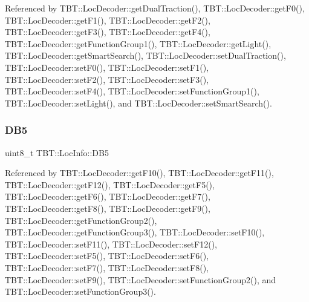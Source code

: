 Referenced by T\+B\+T\+::\+Loc\+Decoder\+::get\+Dual\+Traction(), T\+B\+T\+::\+Loc\+Decoder\+::get\+F0(), T\+B\+T\+::\+Loc\+Decoder\+::get\+F1(), T\+B\+T\+::\+Loc\+Decoder\+::get\+F2(), T\+B\+T\+::\+Loc\+Decoder\+::get\+F3(), T\+B\+T\+::\+Loc\+Decoder\+::get\+F4(), T\+B\+T\+::\+Loc\+Decoder\+::get\+Function\+Group1(), T\+B\+T\+::\+Loc\+Decoder\+::get\+Light(), T\+B\+T\+::\+Loc\+Decoder\+::get\+Smart\+Search(), T\+B\+T\+::\+Loc\+Decoder\+::set\+Dual\+Traction(), T\+B\+T\+::\+Loc\+Decoder\+::set\+F0(), T\+B\+T\+::\+Loc\+Decoder\+::set\+F1(), T\+B\+T\+::\+Loc\+Decoder\+::set\+F2(), T\+B\+T\+::\+Loc\+Decoder\+::set\+F3(), T\+B\+T\+::\+Loc\+Decoder\+::set\+F4(), T\+B\+T\+::\+Loc\+Decoder\+::set\+Function\+Group1(), T\+B\+T\+::\+Loc\+Decoder\+::set\+Light(), and T\+B\+T\+::\+Loc\+Decoder\+::set\+Smart\+Search().

\mbox{\label{structTBT_1_1LocInfo_ae9425a4b329dc1f773042737212fa49c_ae9425a4b329dc1f773042737212fa49c}} 
\subsubsection{\texorpdfstring{D\+B5}{DB5}}
{\footnotesize\ttfamily uint8\+\_\+t T\+B\+T\+::\+Loc\+Info\+::\+D\+B5}



Referenced by T\+B\+T\+::\+Loc\+Decoder\+::get\+F10(), T\+B\+T\+::\+Loc\+Decoder\+::get\+F11(), T\+B\+T\+::\+Loc\+Decoder\+::get\+F12(), T\+B\+T\+::\+Loc\+Decoder\+::get\+F5(), T\+B\+T\+::\+Loc\+Decoder\+::get\+F6(), T\+B\+T\+::\+Loc\+Decoder\+::get\+F7(), T\+B\+T\+::\+Loc\+Decoder\+::get\+F8(), T\+B\+T\+::\+Loc\+Decoder\+::get\+F9(), T\+B\+T\+::\+Loc\+Decoder\+::get\+Function\+Group2(), T\+B\+T\+::\+Loc\+Decoder\+::get\+Function\+Group3(), T\+B\+T\+::\+Loc\+Decoder\+::set\+F10(), T\+B\+T\+::\+Loc\+Decoder\+::set\+F11(), T\+B\+T\+::\+Loc\+Decoder\+::set\+F12(), T\+B\+T\+::\+Loc\+Decoder\+::set\+F5(), T\+B\+T\+::\+Loc\+Decoder\+::set\+F6(), T\+B\+T\+::\+Loc\+Decoder\+::set\+F7(), T\+B\+T\+::\+Loc\+Decoder\+::set\+F8(), T\+B\+T\+::\+Loc\+Decoder\+::set\+F9(), T\+B\+T\+::\+Loc\+Decoder\+::set\+Function\+Group2(), and T\+B\+T\+::\+Loc\+Decoder\+::set\+Function\+Group3().

\mbox{\label{structTBT_1_1LocInfo_acceeedfb63ab970403ce8b75b611f59f_acceeedfb63ab970403ce8b75b611f59f}} 
